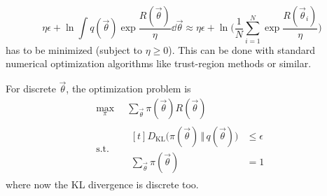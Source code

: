 			\begin{equation*}
				\eta\epsilon + \ln \int\! q(\vec{\theta}) \exp{\frac{R(\vec{\theta})}{\eta}} \dd{\vec{\theta}}
				\approx \eta\epsilon + \ln \Bigg(\! \frac{1}{N} \sum_{i = 1}^{N} \exp{\frac{R(\vec{\theta}_i)}{\eta}} \!\Bigg)
			\end{equation*}
			has to be minimized (subject to \( \eta \geq 0 \)). This can be done with standard numerical optimization algorithms like trust-region methods or similar.

			For discrete \(\vec{\theta}\), the optimization problem is
			\begin{equation}
				\begin{aligned}
					\max_\pi \,         & \sum_{\vec{\theta}} \pi(\vec{\theta}) R(\vec{\theta}) \\
					\mathrm{s.t.} \quad &
					\begin{aligned}[t]
						D_\mathrm{KL}\big( \pi(\vec{\theta}) \,\Vert\, q(\vec{\theta}) \big) & \leq \epsilon \\
						\sum_{\vec{\theta}} \pi(\vec{\theta})                                & = 1
					\end{aligned}
				\end{aligned}
			\end{equation}
			where now the KL divergence is discrete too.


